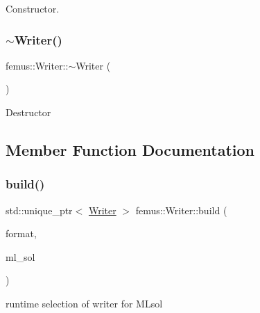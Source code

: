 Constructor. \mbox{\label{classfemus_1_1_writer_a16d2662b9dcdd7a9553578e03ab2a26f}} 
\subsubsection{\texorpdfstring{$\sim$\+Writer()}{~Writer()}}
{\footnotesize\ttfamily femus\+::\+Writer\+::$\sim$\+Writer (\begin{DoxyParamCaption}{ }\end{DoxyParamCaption})\hspace{0.3cm}{\ttfamily [virtual]}}

Destructor 

\subsection{Member Function Documentation}
\mbox{\label{classfemus_1_1_writer_a97628f939955d426bf70b0d3d016705b}} 
\subsubsection{\texorpdfstring{build()}{build()}\hspace{0.1cm}{\footnotesize\ttfamily [1/2]}}
{\footnotesize\ttfamily std\+::unique\+\_\+ptr$<$ \mbox{\hyperlink{classfemus_1_1_writer}{Writer}} $>$ femus\+::\+Writer\+::build (\begin{DoxyParamCaption}\item[{const \mbox{\hyperlink{_writer_enum_8hpp_a18b827c3c1f62b8a57febdcad0c871a8}{Writer\+Enum}}}]{format,  }\item[{\mbox{\hyperlink{classfemus_1_1_multi_level_solution}{Multi\+Level\+Solution}} $\ast$}]{ml\+\_\+sol }\end{DoxyParamCaption})\hspace{0.3cm}{\ttfamily [static]}}

runtime selection of writer for M\+Lsol \mbox{\label{classfemus_1_1_writer_a0728978c3531becf7e0cedac9a8b9d9a}} 
